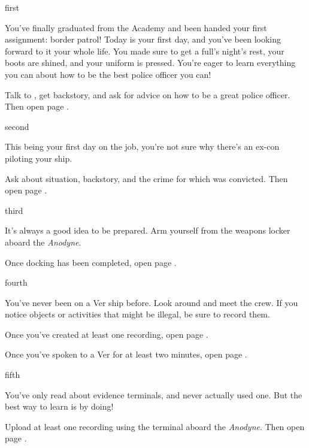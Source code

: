 \documentclass[greennotebook]{guildcamp4} %
\begin{document}
\startnotebook{\nCgoodNotebook{}}

\begin{page}{first}

You've finally graduated from the Academy and been handed your first assignment: border patrol! Today is your first day, and you've been looking forward to it your whole life. You made sure to get a full's night's rest, your boots are shined, and your uniform is pressed. You're eager to learn everything you can about how to be the best police officer you can!

Talk to \cCbad{}, get \cCbad{\their} backstory, and ask for \cCbad{\their} advice on how to be a great police officer. Then open page .

\end{page}

\begin{page}{second}

This being your first day on the job, you're not sure why there's an ex-con piloting your ship. 

Ask \cPilot{} about  situation, \cPilot{\their} backstory, and the crime for which \cPilot{\they} was convicted. Then open page .

\end{page}

\begin{page}{third}

It's always a good idea to be prepared. Arm yourself from the weapons locker aboard the \emph{Anodyne}.

Once docking has been completed, open page .

\end{page}

\begin{page}{fourth}

You've never been on a Ver ship before. Look around and meet the crew. If you notice objects or activities that might be illegal, be sure to record them.

Once you've created at least one recording, open page .

Once you've spoken to a Ver for at least two minutes, open page .

\end{page}

\begin{page}{fifth}

You've only read about evidence terminals, and never actually used one. But the best way to learn is by doing!

Upload at least one recording using the terminal aboard the \emph {Anodyne}. Then open page .

\end{page}
\end{document}
